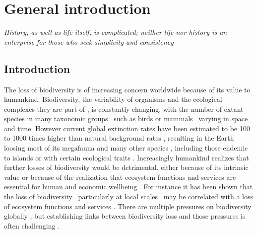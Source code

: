 \chapter{General introduction}
\epigraph{\emph{History, as well as life itself, is complicated; neither life nor history is an enterprise for those who seek simplicity and consistency}}{\cite{Diamond2005}}
\label{C01}

\section{Introduction}
\label{C01_01}

The loss of biodiversity is of increasing concern worldwide because of its value to humankind. Biodiversity, the variability of organisms and the ecological complexes they are part of \citep{SecretariatoftheConventiononBiologicalDiversity2014}, is constantly changing, with the number of extant species in many taxonomic groups \textendash\ such as birds \citep{Jetz2012} or mammals \citep{Upham2019} \textendash\ varying in space and time. However current global extinction rates have been estimated to be 100 to 1000 times higher than natural background rates \citep{Pimm2014}, resulting in the Earth loosing most of its megafauna and many other species \citep{Sandom2014,Ceballos2017,Hallmann2017}, including those endemic to islands \citep{Blackburn2004} or with certain ecological traits \citep{Fritz2009}. Increasingly humankind realizes that further losses of biodiversity would be detrimental, either because of its intrinsic value or because of the realization that ecosystem functions and services are essential for human and economic wellbeing \citep{Cardinale2012,Mace2014}. For instance it has been shown that the loss of biodiversity \textendash\ particularly at local scales \textendash\ may be correlated with a loss of ecosystem functions and services \citep{Albrecht2014,Oliver2015,Hautier2015,Isbell2015}. There are multiple pressures on biodiversity globally \citep{Butchart2010,Steffen2015}, but establishing links between biodiversity loss and those pressures is often challenging \citep{Cardinale2018,DePalma2018}.

